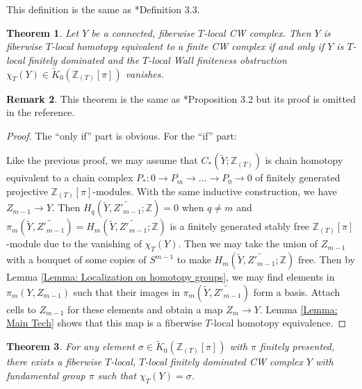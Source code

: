 \documentclass[11pt]{amsart}
\newtheorem{theorem}{Theorem}[section]
\theoremstyle{definition}
\newtheorem{remark}[theorem]{Remark}
\numberwithin{equation}{section}
\numberwithin{equation}{section}
\newcommand\ZZ{\mathbb{Z}}
\begin{document}
This definition is the same as \cite{local-finiteness}*{Definition 3.3}.

\begin{theorem}\label{Thm: Local Finiteness}
Let $Y$ be a connected, fiberwise $T$-local CW complex. Then $Y$ is fiberwise $T$-local homotopy equivalent to a finite CW complex if and only if $Y$ is $T$-local finitely dominated and the $T$-local Wall finiteness obstruction $\chi_{T}(Y)\in \widetilde{K}_0(\ZZ_{(T)}[\pi])$ vanishes.
\end{theorem}

\begin{remark}
This theorem is the same as \cite{local-finiteness}*{Proposition 3.2} but its proof is omitted in the reference.
\end{remark}

\begin{proof}
The ``only if'' part is obvious. For the ``if'' part: 

Like the previous proof, we may assume that $C_*(\widetilde{Y};\ZZ_{(T)})$ is chain homotopy equivalent to a chain complex $P_*:0\rightarrow P_m\rightarrow ...\rightarrow P_0\rightarrow 0$ of finitely generated projective $\ZZ_{(T)}[\pi]$-modules. With the same inductive construction, we have $Z_{m-1}\rightarrow Y$. Then $H_q(\widetilde{Y},\widetilde{Z'_{m-1}};\ZZ)=0$ when $q\neq m$ and $\pi_m(\widetilde{Y},\widetilde{Z'_{m-1}})=H_m(\widetilde{Y},\widetilde{Z'_{m-1}};\ZZ)$ is a finitely generated stably free $\ZZ_{(T)}[\pi]$-module due to the vanishing of $\chi_T(Y)$. Then we may take the union of $Z_{m-1}$ with a bouquet of some copies of $S^{m-1}$ to make $H_m(\widetilde{Y},\widetilde{Z'_{m-1}};\ZZ)$ free. Then by Lemma \ref{Lemma: Localization on homotopy groups}, we may find elements in $\pi_m(Y,Z_{m-1})$ such that their images in $\pi_m(\widetilde{Y},\widetilde{Z'_{m-1}})$ form a basis. Attach cells to $Z_{m-1}$ for these elements and obtain a map $Z_m\rightarrow Y$. Lemma \ref{Lemma: Main Tech} shows that this map is a fiberwise $T$-local homotopy equivalence.
\end{proof}

\begin{theorem}\label{Thm: Realization of local finiteness obstruction}
For any element $\sigma\in\widetilde{K}_0(\ZZ_{(T)}[\pi])$ with $\pi$ finitely presented, there exists a fiberwise $T$-local, $T$-local finitely dominated CW complex $Y$ with fundamental group $\pi$ such that $\chi_{T}(Y)=\sigma$.
\end{theorem}
\end{document}

